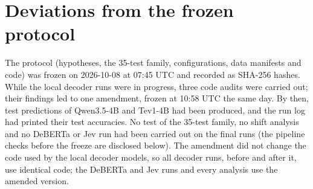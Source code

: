 \section{Deviations from the frozen protocol}
\label{app:deviations}

The protocol (hypotheses, the 35-test family, configurations, data manifests and code) was frozen on 2026-10-08 at
07:45 UTC and recorded as SHA-256 hashes. While the local decoder runs were in progress, three code audits
were carried out; their findings led to one amendment, frozen at 10:58 UTC the same day. By then, test predictions of
Qwen3.5-4B and Tev1-4B had been produced, and the run log had printed their test accuracies. No test of the
35-test family, no shift analysis and no DeBERTa or Jev run had been carried out on the final runs (the pipeline checks
before the freeze are disclosed below). The amendment did not change the code
used by the local decoder models, so all decoder runs, before and after it, use identical code; the DeBERTa and Jev
runs and every analysis use the amended version.
